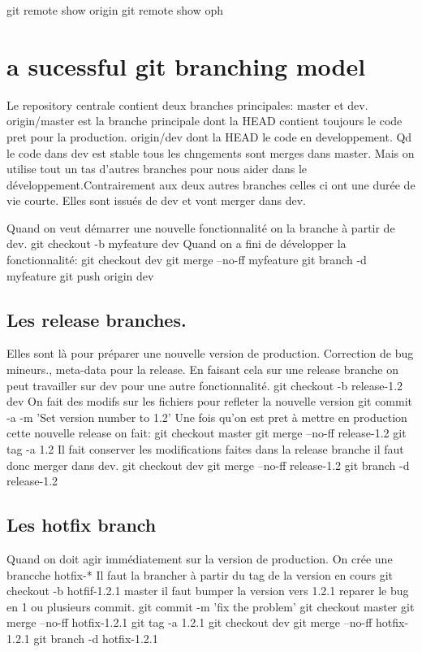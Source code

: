 \documentclass[12pt,a4paper]{article}
\begin{document}
git remote show origin
git remote show oph

\section{a sucessful git branching model}
\label{sec:modelbranching}

Le repository centrale contient deux branches principales: master et dev.
origin/master est la branche principale dont la HEAD contient toujours le code pret pour la production. origin/dev dont la HEAD le code en developpement. Qd le code dans dev est stable tous les chngements sont merges dans master. 
Mais on utilise tout un tas d'autres branches pour nous aider dans le développement.Contrairement aux deux autres branches celles ci ont une durée de vie courte. Elles sont issués de dev et vont merger dans dev.

Quand on veut démarrer une nouvelle fonctionnalité on la branche à partir de dev. git checkout -b myfeature dev
Quand on a fini de développer la fonctionnalité:
git checkout dev
git merge --no-ff myfeature
git branch -d myfeature
git push origin dev

\subsection{Les release branches.}
\label{sec:releasebranch}
Elles sont là pour préparer une nouvelle version de production. Correction de bug mineurs., meta-data pour la release. En faisant cela sur une release branche on peut travailler sur dev pour une autre fonctionnalité.
git checkout -b release-1.2 dev
On fait des modifs sur les fichiers pour refleter la nouvelle version
git commit -a -m 'Set version number to 1.2'
Une fois qu'on est pret à mettre en production cette nouvelle release on fait:
git checkout master 
git merge --no-ff release-1.2
git tag -a 1.2
Il fait conserver les modifications faites dans la release branche il faut donc merger dans dev. 
git checkout dev
git merge --no-ff release-1.2
git branch -d release-1.2

\subsection{Les hotfix branch}
\label{sec:hotfix}
Quand on doit agir immédiatement sur la version de production. On crée une brancche hotfix-* 
Il faut la brancher à partir du tag de la version en cours 
git checkout -b hotfif-1.2.1 master
il faut bumper la version vers 1.2.1
reparer le bug en 1 ou plusieurs commit.
git commit -m 'fix the problem'
git checkout master
git merge --no-ff hotfix-1.2.1
git tag -a 1.2.1
git checkout dev 
git merge --no-ff hotfix-1.2.1
git branch -d hotfix-1.2.1
\end{document}
